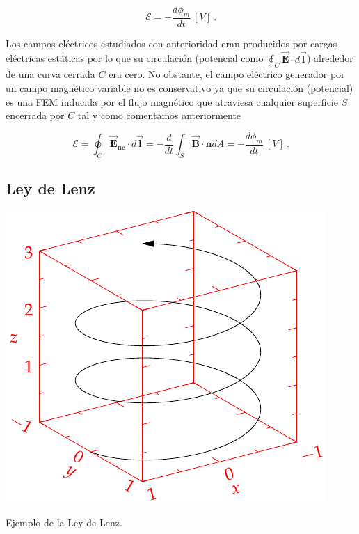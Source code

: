 \documentclass{tufte-handout}
\begin{document}
\begin{equation}
\mathcal{E} = -\displaystyle\frac{d\phi_m}{dt}~[V]~.
\end{equation}

Los campos eléctricos estudiados con anterioridad eran producidos por cargas eléctricas estáticas por lo que su circulación (potencial como $\oint_{C}\mathbf{\vec{E}}\cdot d\mathbf{\vec{l}}$) alrededor de una curva cerrada $C$ era cero. No obstante, el campo eléctrico generador por un campo magnético variable no es conservativo ya que su circulación (potencial) es una FEM inducida por el flujo magnético que atraviesa cualquier superficie $S$ encerrada por $C$ tal y como comentamos anteriormente

\begin{equation}
\mathcal{E} = \oint_{C}\mathbf{\vec{E}_{nc}}\cdot d \mathbf{\vec{l}} = -\displaystyle\frac{d}{dt}\int_{S}\mathbf{\vec{B}}\cdot\mathbf{\hat{n}}dA = -\displaystyle\frac{d\phi_m}{dt}~[V]~.
\end{equation}

\subsection{Ley de Lenz}

\begin{marginfigure}%
    \includegraphics[width=\linewidth]{helix}
    \caption{Ejemplo de la Ley de Lenz.}
    \label{fig:ejemplolenz}
\end{marginfigure}
\end{document}
